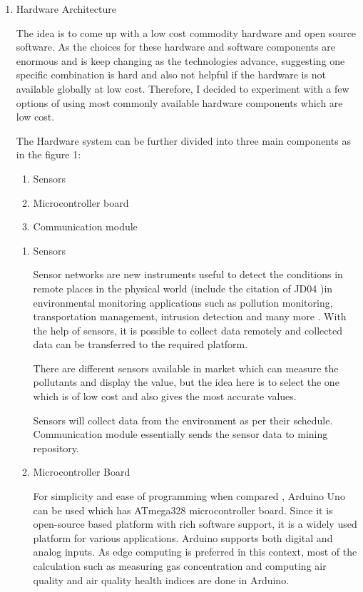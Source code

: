 \documentclass[11pt]{article}
\begin{document}
\begin{enumerate}

\item {Hardware Architecture}

The idea is to come up with a low cost commodity hardware and  open source software. As the choices for these hardware and software components are enormous and is keep changing as the technologies advance, suggesting one specific combination is hard and also not helpful if the hardware is not available globally at low cost. Therefore, I decided to experiment with a few options of using most commonly available hardware components which are low cost. 

The Hardware system can be further divided into three main components as in the figure 1:
\begin{enumerate}
\item  Sensors
\item  Microcontroller board
\item  Communication module
\end{enumerate}


\begin{enumerate}
   \item Sensors
    
    Sensor networks are new instruments useful to detect the conditions in remote places in the physical world (include the citation of {JD04} )in environmental monitoring applications such as pollution monitoring, transportation management, intrusion detection and many more \cite{Jung2011}. With the help of sensors, it is possible to collect data remotely and collected data can be transferred to the required platform.
    
    There are different sensors available in market which can measure the pollutants and display the value, but the idea here is to select the one which is of low cost and also gives the most accurate values.
    
     
    Sensors will collect data from the environment as per their schedule. Communication module essentially sends the sensor data to mining repository.
    
 \item {Microcontroller Board}


 
 For simplicity and ease of programming when compared , Arduino Uno can be used which has ATmega328 microcontroller board. Since it is open-source based platform with rich software support, it is a widely used platform for various applications. Arduino supports both digital and analog inputs. As edge computing is preferred in this context, most of the calculation such as measuring gas concentration and computing air quality and air quality health indices are done in Arduino.




\end{enumerate}
\end{enumerate}
\end{document}
